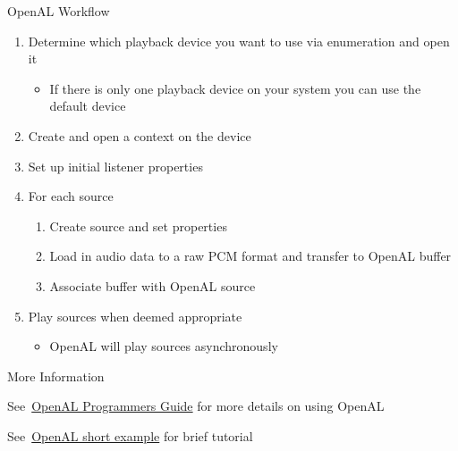 \documentclass{beamer}
\newcommand{\hrefhand}[2]{\raisebox{-0.4ex}{\HandRight}\,\href{#1}{#2}}
\begin{document}
\begin{frame}[fragile]{OpenAL Workflow}
    \begin{enumerate}
        \item Determine which playback device you want to use via enumeration and open it
              \begin{itemize}
                  \item If there is only one playback device on your system you can use the default device
              \end{itemize}
        \item Create and open a context on the device
        \item Set up initial listener properties
        \item For each source
              \begin{enumerate}
                  \item Create source and set properties
                  \item Load in audio data to a raw PCM format and transfer to OpenAL buffer
                  \item Associate buffer with OpenAL source
              \end{enumerate}
        \item Play sources when deemed appropriate
              \begin{itemize}
                  \item OpenAL will play sources asynchronously
              \end{itemize}
    \end{enumerate}
\end{frame}

\begin{frame}[fragile]{More Information}
    \begin{examples}
        See \hrefhand{https://www.openal.org/documentation/OpenAL_Programmers_Guide.pdf}{\color{blue}OpenAL Programmers Guide} for more details on using OpenAL
    \end{examples}

    \begin{examples}
        See \hrefhand{https://ffainelli.github.io/openal-example/}{\color{blue}OpenAL short example} for brief tutorial
    \end{examples}
\end{frame}
\end{document}
